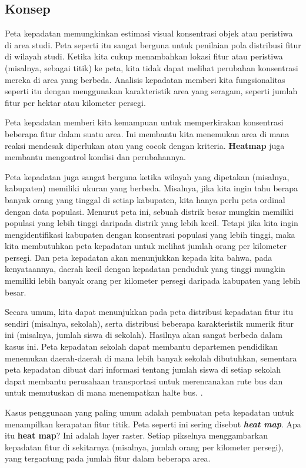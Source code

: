 \documentclass[]{book}
\begin{document}
\hypertarget{konsep}{%
\subsection{Konsep}\label{konsep}}

Peta kepadatan memungkinkan estimasi visual konsentrasi objek atau peristiwa di area studi. Peta seperti itu sangat berguna untuk penilaian pola distribusi fitur di wilayah studi. Ketika kita cukup menambahkan lokasi fitur atau peristiwa (misalnya, sebagai titik) ke peta, kita tidak dapat melihat perubahan konsentrasi mereka di area yang berbeda. Analisis kepadatan memberi kita fungsionalitas seperti itu dengan menggunakan karakteristik area yang seragam, seperti jumlah fitur per hektar atau kilometer persegi.

Peta kepadatan memberi kita kemampuan untuk memperkirakan konsentrasi beberapa fitur dalam suatu area. Ini membantu kita menemukan area di mana reaksi mendesak diperlukan atau yang cocok dengan kriteria. \textbf{Heatmap} juga membantu mengontrol kondisi dan perubahannya.

Peta kepadatan juga sangat berguna ketika wilayah yang dipetakan (misalnya, kabupaten) memiliki ukuran yang berbeda. Misalnya, jika kita ingin tahu berapa banyak orang yang tinggal di setiap kabupaten, kita hanya perlu peta ordinal dengan data populasi. Menurut peta ini, sebuah distrik besar mungkin memiliki populasi yang lebih tinggi daripada distrik yang lebih kecil. Tetapi jika kita ingin mengidentifikasi kabupaten dengan konsentrasi populasi yang lebih tinggi, maka kita membutuhkan peta kepadatan untuk melihat jumlah orang per kilometer persegi. Dan peta kepadatan akan menunjukkan kepada kita bahwa, pada kenyataannya, daerah kecil dengan kepadatan penduduk yang tinggi mungkin memiliki lebih banyak orang per kilometer persegi daripada kabupaten yang lebih besar.

Secara umum, kita dapat menunjukkan pada peta distribusi kepadatan fitur itu sendiri (misalnya, sekolah), serta distribusi beberapa karakteristik numerik fitur ini (misalnya, jumlah siswa di sekolah). Hasilnya akan sangat berbeda dalam kasus ini. Peta kepadatan sekolah dapat membantu departemen pendidikan menemukan daerah-daerah di mana lebih banyak sekolah dibutuhkan, sementara peta kepadatan dibuat dari informasi tentang jumlah siswa di setiap sekolah dapat membantu perusahaan transportasi untuk merencanakan rute bus dan untuk memutuskan di mana menempatkan halte bus. .

Kasus penggunaan yang paling umum adalah pembuatan peta kepadatan untuk menampilkan kerapatan fitur titik. Peta seperti ini sering disebut \textbf{\emph{heat map}}. Apa itu \textbf{heat map}? Ini adalah layer raster. Setiap pikselnya menggambarkan kepadatan fitur di sekitarnya (misalnya, jumlah orang per kilometer persegi), yang tergantung pada jumlah fitur dalam beberapa area.
\end{document}
